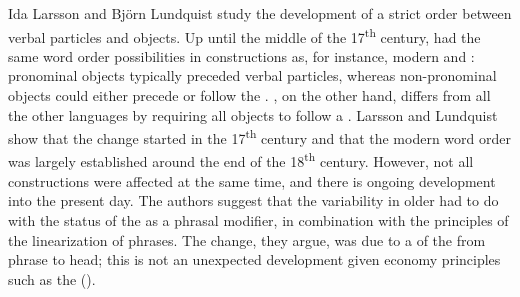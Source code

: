 \documentclass[output=paper]{langscibook}
\begin{document}
Ida Larsson and Björn Lundquist study the development of a strict order between verbal particles and objects. Up until the middle of the 17\textsuperscript{th} century,  had the same word order possibilities in  constructions as, for instance, modern  and : pronominal objects typically preceded verbal particles, whereas non-pronominal objects could either precede or follow the . , on the other hand, differs from all the other  languages by requiring all objects to follow a . Larsson and Lundquist show that the change started in the 17\textsuperscript{th} century and that the modern word order was largely established around the end of the 18\textsuperscript{th} century. However, not all  constructions were affected at the same time, and there is ongoing development into the present day. The authors suggest that the variability in older  had to do with the status of the  as a phrasal modifier, in combination with the principles of the linearization of phrases. The change, they argue, was due to a  of the  from phrase to head; this is not an unexpected development given economy principles such as the  (\citealt{van_Gelderen2004}).
\end{document}
